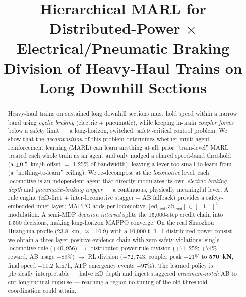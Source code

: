 \documentclass[conference]{IEEEtran}
\newcommand{\permille}{\textperthousand}
\begin{document}
\title{Hierarchical MARL for Distributed-Power $\times$ Electrical/Pneumatic
Braking Division of Heavy-Haul Trains on Long Downhill Sections}

\author{
}

\maketitle

\begin{abstract}
Heavy-haul trains on sustained long downhill sections must hold speed within a
narrow band using \emph{cyclic braking} (electric $+$ pneumatic), while keeping
in-train \emph{coupler forces} below a safety limit --- a long-horizon,
switched, safety-critical control problem. We show that the \emph{decomposition}
of this problem determines whether multi-agent reinforcement learning (MARL)
can learn anything at all: prior ``train-level'' MARL treated each whole train
as an agent and only nudged a shared speed-band threshold (a $\pm 0.5$~km/h
offset $=$ 1.25\% of bandwidth), leaving a lever too small to learn from (a
``nothing-to-learn'' ceiling). We re-decompose at the \emph{locomotive} level:
each locomotive is an independent agent that directly modulates its own
\emph{electric-braking depth} and \emph{pneumatic-braking trigger} --- a
continuous, physically meaningful lever. A rule engine (ED-first $+$
inter-locomotive stagger $+$ AB fallback) provides a safety-embedded inner
layer; MAPPO adds per-locomotive $[\mathrm{ed}_{mod},\mathrm{ab}_{mod}]
\in[-1,1]^2$ modulation. A semi-MDP \emph{decision interval} splits the
15{,}000-step credit chain into 1{,}500 decisions, making long-horizon MAPPO
converge. On the real Shuozhou--Huanghua profile (23.8~km, $\approx
-10.9$\permille) with a 10{,}000-t, 1+1 distributed-power consist, we obtain a
three-layer positive evidence chain with zero safety violations:
single-locomotive rule ($+40{,}956$) $\rightarrow$ distributed-power rule
division ($+71{,}252$; $+74\%$ reward, AB usage $-89\%$) $\rightarrow$ RL
division ($+72{,}743$; coupler peak $-21\%$ to \textbf{570~kN}, final speed
$+11.2$~km/h, ATP emergency events $-97\%$). The learned policy is physically
interpretable --- halve ED depth and inject staggered \emph{minimum-notch} AB
to cut longitudinal impulse --- reaching a region no tuning of the old
threshold coordination could attain.
\end{abstract}
\end{document}
